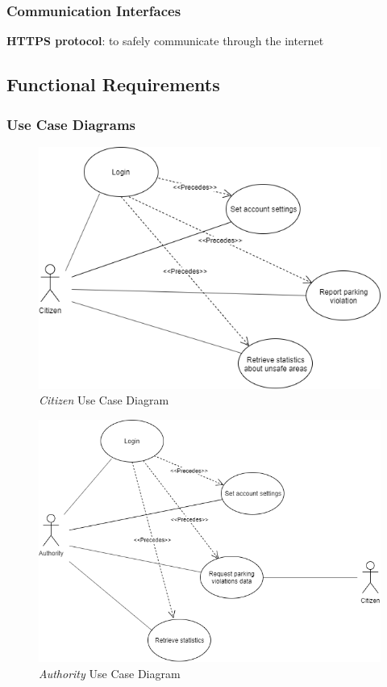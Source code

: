 \documentclass{article}
\begin{document}
\subsubsection{Communication Interfaces}
\textbf{HTTPS protocol}: to safely communicate through the internet

\clearpage
\subsection{Functional Requirements}
\subsubsection{Use Case Diagrams}
\begin{figure}[h!]
    \centering
    \includegraphics[scale=0.5]{img/use_case_diagrams/citizen.png}
    \caption{\textit{Citizen} Use Case Diagram}
\end{figure}
\clearpage
\begin{figure}[h!]
    \centering
    \includegraphics[scale=0.5]{img/use_case_diagrams/authority.png}
    \caption{\textit{Authority} Use Case Diagram}
\end{figure}
\end{document}
